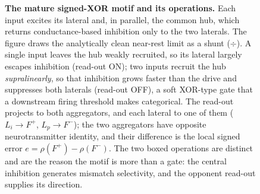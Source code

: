 \begin{figure}[t]

\caption{\textbf{The mature signed-XOR motif and its operations.} Each input
excites its lateral and, in parallel, the common hub, which returns
conductance-based inhibition only to the two laterals. The figure draws the
analytically clean near-rest limit as a shunt ($\div$). A single input leaves
the hub weakly recruited, so its lateral largely escapes inhibition (read-out
ON); two inputs recruit the hub \emph{supralinearly}, so that inhibition grows
faster than the drive and suppresses both laterals (read-out OFF), a soft
XOR-type gate that a downstream firing threshold makes categorical. The
read-out projects to both aggregators, and each lateral to one of them
($L_i\!\to\!F^{+}$, $L_p\!\to\!F^{-}$); the two aggregators have opposite
neurotransmitter identity, and their difference is the local signed error
$e=\rho(F^{+})-\rho(F^{-})$. The two boxed operations are distinct and are the
reason the motif is more than a gate: the central inhibition generates mismatch
selectivity, and the opponent read-out supplies its direction.}
\label{fig:mature}
\end{figure}
